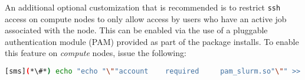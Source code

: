 An additional optional customization that is recommended is to
restrict \texttt{ssh} access on compute nodes to only allow access by users who
have an active job associated with the node. This can be enabled via the use of
a pluggable authentication module (PAM) provided as part of the \SLURM{} package
installs. To enable this feature on {\em compute} nodes, issue the
following:

\begin{lstlisting}[language=bash,keywords={},upquote=true]
[sms](*\#*) echo "echo "\""account    required     pam_slurm.so"\"" >> /etc/pam.d/sshd" >> $postbootscript
\end{lstlisting}


